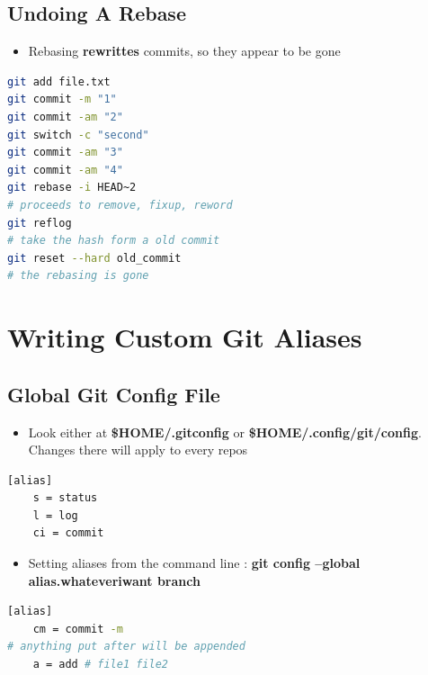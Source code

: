 \documentclass{report}
\begin{document}
\section{Undoing A Rebase}

\begin{itemize}
	\item Rebasing \textbf{rewrittes} commits, so they appear to be gone
\end{itemize}

\begin{tcolorbox}[title=Example Of Undoing Rebase,colback=backcolour]
\begin{lstlisting}[language=bash]
git add file.txt
git commit -m "1"
git commit -am "2"
git switch -c "second"
git commit -am "3"
git commit -am "4"
git rebase -i HEAD~2
# proceeds to remove, fixup, reword
git reflog
# take the hash form a old commit
git reset --hard old_commit
# the rebasing is gone
\end{lstlisting}
\end{tcolorbox}



\chapter{Writing Custom Git Aliases}


\section{Global Git Config File}

\begin{itemize}
	\item Look either at \textbf{\$HOME/.gitconfig} or \textbf{\$HOME/.config/git/config}. Changes there will apply to every repos 
\end{itemize}

\begin{tcolorbox}[title=Adding Git Alias,colback=backcolour]
\begin{lstlisting}[language=bash]
[alias]
	s = status
	l = log
	ci = commit
\end{lstlisting}
\end{tcolorbox}

\begin{itemize}
	\item Setting aliases from the command line : \textbf{git config --global alias.whateveriwant branch} 
\end{itemize}

\begin{tcolorbox}[title=Aliases With Arguments,colback=backcolour]
\begin{lstlisting}[language=bash]
[alias]
	cm = commit -m
# anything put after will be appended
	a = add # file1 file2
\end{lstlisting}
\end{tcolorbox}
\end{document}
